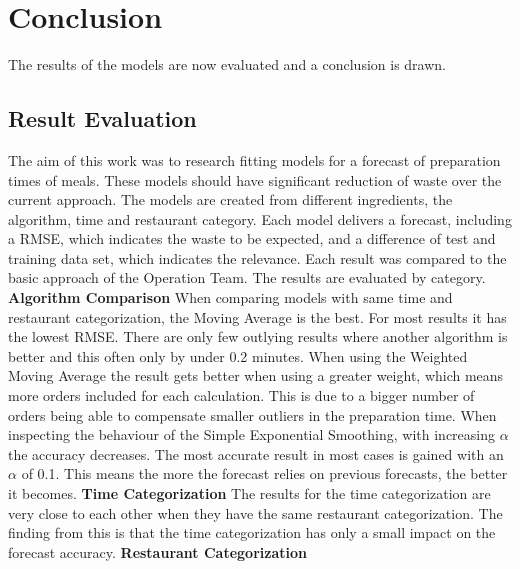 \chapter{Conclusion}\label{chapter:Conclusion}
The results of the models are now evaluated and a conclusion is drawn.
\section{Result Evaluation}
The aim of this work was to research fitting models for a forecast of preparation times of meals. These models should have significant reduction of waste over the current approach.\newline
The models are created from different ingredients, the algorithm, time and restaurant category. Each model delivers a forecast, including a RMSE, which indicates the waste to be expected, and a difference of test and training data set, which indicates the relevance. Each result was compared to the basic approach of the Operation Team.\newline
The results are evaluated by category.\newline
\newline\textbf{Algorithm Comparison}\newline
When comparing models with same time and restaurant categorization, the Moving Average is the best. For most results it has the lowest RMSE. There are only few outlying results where another algorithm is better and this often only by under 0.2 minutes.\newline
When using the Weighted Moving Average the result gets better when using a greater weight, which means more orders included for each calculation. This is due to a bigger number of orders being able to compensate smaller outliers in the preparation time.\newline
When inspecting the behaviour of the Simple Exponential Smoothing, with increasing $\alpha$ the accuracy decreases. The most accurate result in most cases is gained with an $\alpha$ of 0.1. This means the more the forecast relies on previous forecasts, the better it becomes.
\newline\textbf{Time Categorization}\newline
The results for the time categorization are very close to each other when they have the same restaurant categorization. The finding from this is that the time categorization has only a small impact on the forecast accuracy.
\newline\textbf{Restaurant Categorization}\newline
